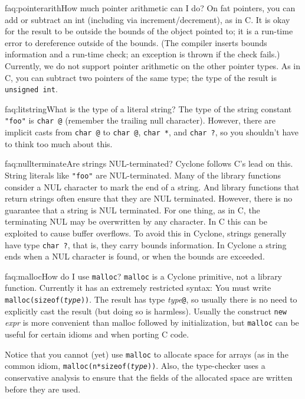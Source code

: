 \begin{faqa}{faq:pointerarith}{How much pointer arithmetic can I do?}
On fat pointers, you can add or subtract an int (including via
increment/decrement), as in C\@.  It is okay for the result to be
outside the bounds of the object pointed to; it is a run-time error to
dereference outside of the bounds.  (The compiler inserts bounds
information and a run-time check; an exception is thrown if the check
fails.)  Currently, we do not support pointer arithmetic on the other
pointer types.  As in C, you can subtract two pointers of the same
type; the type of the result is \texttt{unsigned int}.
\end{faqa}

\begin{faqa}{faq:litstring}{What is the type of a literal string?}
The type of the string constant \texttt{"foo"} is \texttt{char @\rb} (remember the trailing null character).  However, there are implicit
casts from \texttt{char @\rb} to \texttt{char @\rb},
\texttt{char *\rb}, and \texttt{char ?}, so you shouldn't have to
think too much about this.
\end{faqa}

\begin{faqa}{faq:nullterminate}{Are strings NUL-terminated?}
Cyclone follows C's lead on this.  String literals like \texttt{"foo"}
are NUL-terminated.  Many of the library functions consider a NUL
character to mark the end of a string.  And library functions that
return strings often ensure that they are NUL terminated.  However,
there is no guarantee that a string is NUL terminated.  For one
thing, as in C, the terminating NUL may be overwritten by any
character.  In C this can be exploited to cause buffer overflows.  To
avoid this in Cyclone, strings generally have type \texttt{char ?},
that is, they carry bounds information.  In Cyclone a string ends when
a NUL character is found, or when the bounds are exceeded.
\end{faqa}

\begin{faqa}{faq:malloc}{How do I use \texttt{malloc}?}
\texttt{malloc} is a Cyclone primitive, not a library function.
Currently it has an extremely restricted syntax: You must write
\texttt{malloc(sizeof(\textit{type}))}.  The result has type
\textit{type}\texttt{@}, so usually there is no need to explicitly
cast the result (but doing so is harmless).  Usually the construct
\texttt{new} \textit{expr} is more convenient than malloc followed by
initialization, but \texttt{malloc} can be useful for certain idioms
and when porting C code.

Notice that you cannot (yet) use \texttt{malloc} to allocate space for
arrays (as in the common idiom, \texttt{malloc(n*sizeof({\it type}))}.
Also, the type-checker uses a conservative analysis to ensure that the
fields of the allocated space are written before they are used.
\end{faqa}

